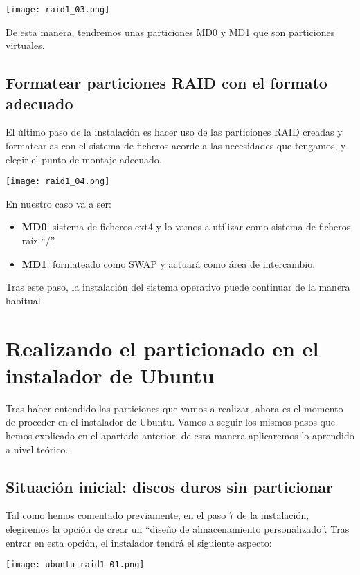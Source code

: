 \begin{center}
    \texttt{[image: raid1\_03.png]}
\end{center}

De esta manera, tendremos unas particiones MD0 y MD1 que son particiones virtuales.

\subsection{Formatear particiones RAID con el formato adecuado}
El último paso de la instalación es hacer uso de las particiones RAID creadas y formatearlas con el sistema de ficheros acorde a las necesidades que tengamos, y elegir el punto de montaje adecuado.

\begin{center}
    \texttt{[image: raid1\_04.png]}
\end{center}

En nuestro caso va a ser:
\begin{itemize}
    \item  \textbf{MD0}: sistema de ficheros ext4 y lo vamos a utilizar como sistema de ficheros raíz “/”.
    \item  \textbf{MD1}: formateado como SWAP y actuará como área de intercambio.
\end{itemize}

Tras este paso, la instalación del sistema operativo puede continuar de la manera habitual.

\section{Realizando el particionado en el instalador de Ubuntu}
Tras haber entendido las particiones que vamos a realizar, ahora es el momento de proceder en el instalador de Ubuntu. Vamos a seguir los mismos pasos que hemos explicado en el apartado anterior, de esta manera aplicaremos lo aprendido a nivel teórico.

\subsection{Situación inicial: discos duros sin particionar}
Tal como hemos comentado previamente, en el paso 7 de la instalación, elegiremos la opción de crear un “diseño de almacenamiento personalizado”. Tras entrar en esta opción, el instalador tendrá el siguiente aspecto:

\begin{center}
    \texttt{[image: ubuntu\_raid1\_01.png]}
\end{center}

